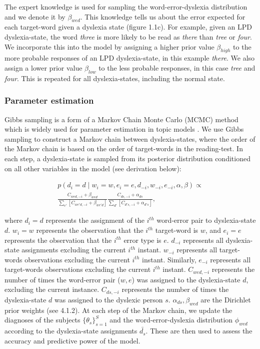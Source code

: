 The expert knowledge is used for sampling the word-error-dyslexia distribution and we denote it by $ \beta_{wed} $. This knowledge tells us about the error expected for each target-word given a dyslexia state (figure 1.1c). For example, given an LPD dyslexia-state, the word {\it three} is more likely to be read as {\it there} than {\it tree} or {\it four}. We incorporate this into the model by assigning a higher prior value $ \beta_{high} $ to the more probable responses of an LPD dyslexia-state, in this example {\it there}. We also assign a lower prior value $ \beta_{low} $ to the less probable responses, in this case {\it tree} and {\it four}. This is repeated for all dyslexia-states, including the normal state.

\subsubsection{Parameter estimation}
Gibbs sampling is a form of a Markov Chain Monte Carlo (MCMC) method which is widely used for parameter estimation in topic models \citep{gs04, rgss04}. We use Gibbs sampling to construct a Markov chain between dyslexia-states, where the order of the Markov chain is based on the order of target-words in the reading-test. In each step, a dyslexia-state is sampled from its posterior distribution conditioned on all other variables in the model (see derivation below): 

\begin{equation}
\begin{split}
p(d_i = d\mid w_i = w, e_i = e, d_{-i}, w_{-i}, e_{-i}, \alpha, \beta) \propto \\
\frac{ C_{wed, -i} + \beta_{wed} } {\sum_{e'} [C_{we'd, -i} + \beta_{we'd}] } \frac{ C_{ds, -i} + \alpha_{ds} } {{\sum_{d'}[ C_{d's, -i} + \alpha_{d's}] }},
\end{split}
\end{equation}

where $ d_i=d $ represents the assignment of the $ i^{th} $ word-error pair to dyslexia-state $d$. $ w_i = w $ represents the observation that the $i^{th}$ target-word is $w$, and $e_i = e $ represents the observation that the $i^{th}$ error type is $e$. $ d_{-i} $ represents all dyslexia-state assignments excluding the current $i^{th}$ instant. $ w_{-i} $ represents all target-words observations excluding the current $i^{th}$ instant. Similarly, $ e_{-i} $ represents all target-words observations excluding the current $i^{th}$ instant.
$ C_{wed, -i} $ represents the number of times the word-error pair ($w, e$) was assigned to the dyslexia-state $d$, excluding the current instance. $ C_{ds, -i} $ represents the number of times the dyslexia-state $d$ was assigned to the dyslexic person $s$. $ \alpha_{ds} , \beta_{wed} $ are the Dirichlet prior weights (see 4.1.2).
At each step of the Markov chain, we update the diagnoses of the subjects $ { \{ \theta_{s} \} }_{s=1}^S $ and the word-error-dyslexia distribution $ \phi_{wed} $ according to the dyslexia-state assignments $ \bar{d_{s}} $. These are then used to assess the accuracy and predictive power of the model.

